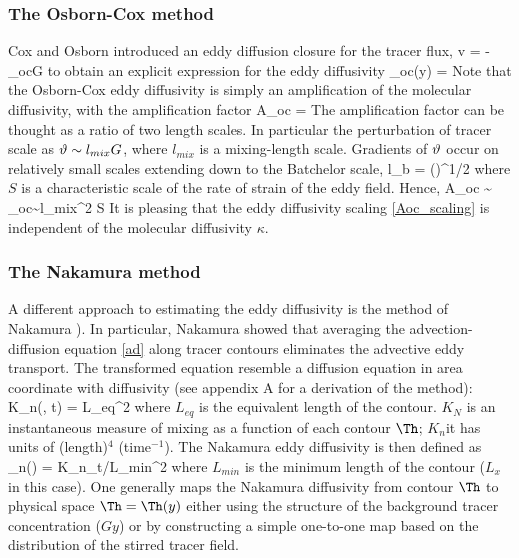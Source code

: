 \documentclass[11pt]{article}
\newcommand{\kappaN}{\kappa_{n}}
\newcommand{\kappaoc}{\kappa_{oc}}
\begin{document}
\subsubsection{The Osborn-Cox method}
 
Cox and Osborn introduced an eddy diffusion closure for the tracer flux,
\beq
\label{oc_diff}
\la v \vth \raxt = - \kappaoc G\com
\eeq
to obtain an explicit expression for the eddy diffusivity
\beq
\label{koc}
\kappaoc(y) =  \kappa\per
\eeq
Note that the Osborn-Cox eddy diffusivity is simply an amplification of the molecular diffusivity, with the amplification
factor
\beq
A_{oc} = \per
\eeq
The amplification factor can be thought as a ratio of two length scales. In particular the perturbation of tracer scale as
$\vartheta \sim l_{mix} G$, where $l_{mix}$ is a mixing-length scale. Gradients of $\vartheta$ occur on relatively small scales extending
down to the Batchelor scale,
\beq
l_b = \left(\right)^{1/2}\com
\eeq
where $S$ is a characteristic scale of the rate of strain of the eddy field. Hence,
\beq
\label{Aoc_scaling}
A_{oc} \sim {} \Longrightarrow \kappaoc \sim l_{mix}^2 S\per
\eeq
It is pleasing that the eddy diffusivity scaling \eqref{Aoc_scaling} is independent of the molecular diffusivity $\kappa$.

\subsubsection{The Nakamura method}

A different approach to estimating the eddy diffusivity is the method of Nakamura ). In particular, Nakamura showed that averaging the advection-diffusion equation \eqref{ad} along tracer contours eliminates the advective eddy transport. The transformed equation resemble a diffusion equation in area coordinate with diffusivity (see appendix A for a derivation of the method):
\beq
\label{kN}
K_{n}(\Th, t) = L_{eq}^2 \kappa\com
\eeq
where $L_{eq}$ is the equivalent length of the contour. $K_N$ is an instantaneous measure of mixing as a function of each contour $\Th$; $K_n$it has units of (length)$^4$ (time$^{-1}$). The Nakamura eddy diffusivity is then defined as
\beq
\kappaN(\Th) = \la K_n\ra_t/L_{min}^2\com
\eeq
where $L_{min}$ is the minimum length of the contour ($L_x$ in this case). One generally maps the Nakamura diffusivity from 
 contour $\Th$ to physical space $\Th = \Th(y)$ either using the structure of the background tracer concentration ($G y$) or by constructing a simple one-to-one map based on the distribution of the stirred tracer field.
\end{document}
